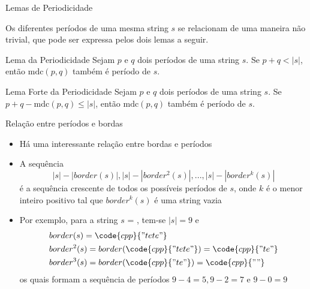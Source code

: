 \begin{frame}[fragile]{Lemas de Periodicidade}

    Os diferentes períodos de uma mesma string $s$ se relacionam de uma maneira não trivial, que 
        pode ser expressa pelos dois lemas a seguir.
        \pause

    \begin{block}{Lema da Periodicidade}
        Sejam $p$ e $q$ dois períodos de uma string $s$. Se $p + q < |s|$, então 
            $\mathrm{mdc}(p, q)$ também é período de $s$.
    \end{block} 

    \vspace{0.1in}
        \pause

    \begin{block}{Lema Forte da Periodicidade}
        Sejam $p$ e $q$ dois períodos de uma string $s$. Se $p + q - \mathrm{mdc}(p, q) \leq |s|$, 
            então $\mbox{mdc}(p, q)$ também é período de $s$.
    \end{block} 

\end{frame}

\begin{frame}[fragile]{Relação entre períodos e bordas}

    \begin{itemize}
        \item Há uma interessante relação entre bordas e períodos
        \pause

        \item A sequência
        \[
            |s| - |border(s)|, |s| - |border^2(s)|, ..., |s| - |border^k(s)|
        \]
        é a sequência crescente de todos os possíveis períodos de $s$, onde $k$ é o menor inteiro 
        positivo tal que $border^k(s)$ é uma string vazia
        \pause

        \item Por exemplo, para a string $s$ = , tem-se $|s| = 9$ e
        \begin{align*}
            & border(s) = \code{cpp}{"tete"} \\
            & border^2(s) = border(\code{cpp}{"tete"}) = \code{cpp}{"te"} \\
            & border^3(s) = border(\code{cpp}{"te"}) = \code{cpp}{""}
        \end{align*}
        os quais formam a sequência de períodos $9 - 4 = 5, 9 - 2 = 7$ e $9 - 0 = 9$
    \end{itemize}

\end{frame}

